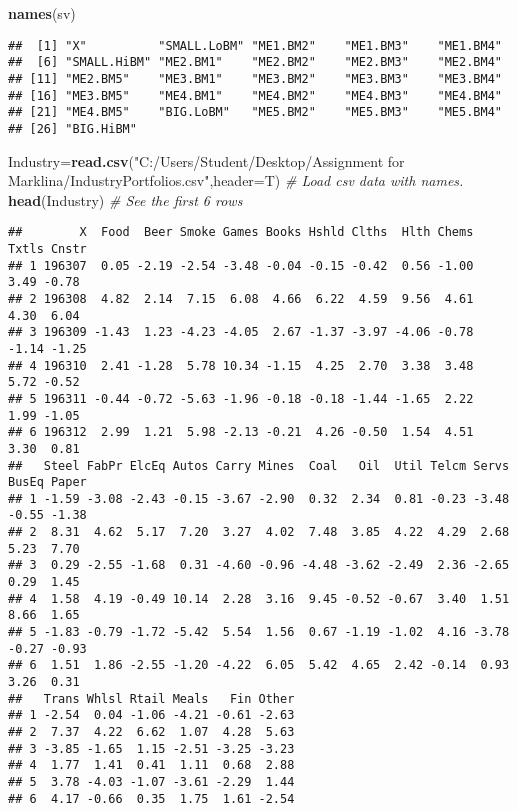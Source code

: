 \documentclass[
]{article}
\newenvironment{Shaded}{\begin{snugshade}}{\end{snugshade}}
\newcommand{\AttributeTok}[1]{\textcolor[rgb]{0.13,0.29,0.53}{#1}}
\newcommand{\CommentTok}[1]{\textcolor[rgb]{0.56,0.35,0.01}{\textit{#1}}}
\newcommand{\FunctionTok}[1]{\textcolor[rgb]{0.13,0.29,0.53}{\textbf{#1}}}
\newcommand{\NormalTok}[1]{#1}
\newcommand{\OtherTok}[1]{\textcolor[rgb]{0.56,0.35,0.01}{#1}}
\newcommand{\StringTok}[1]{\textcolor[rgb]{0.31,0.60,0.02}{#1}}
\begin{document}
\begin{Shaded}
\begin{Highlighting}[]
\FunctionTok{names}\NormalTok{(sv)}
\end{Highlighting}
\end{Shaded}

\begin{verbatim}
##  [1] "X"          "SMALL.LoBM" "ME1.BM2"    "ME1.BM3"    "ME1.BM4"   
##  [6] "SMALL.HiBM" "ME2.BM1"    "ME2.BM2"    "ME2.BM3"    "ME2.BM4"   
## [11] "ME2.BM5"    "ME3.BM1"    "ME3.BM2"    "ME3.BM3"    "ME3.BM4"   
## [16] "ME3.BM5"    "ME4.BM1"    "ME4.BM2"    "ME4.BM3"    "ME4.BM4"   
## [21] "ME4.BM5"    "BIG.LoBM"   "ME5.BM2"    "ME5.BM3"    "ME5.BM4"   
## [26] "BIG.HiBM"
\end{verbatim}

\begin{Shaded}
\begin{Highlighting}[]
\NormalTok{Industry}\OtherTok{=}\FunctionTok{read.csv}\NormalTok{(}\StringTok{"C:/Users/Student/Desktop/Assignment for Marklina/IndustryPortfolios.csv"}\NormalTok{,}\AttributeTok{header=}\NormalTok{T) }\CommentTok{\# Load csv data with names.}
\FunctionTok{head}\NormalTok{(Industry) }\CommentTok{\# See the first 6 rows}
\end{Highlighting}
\end{Shaded}

\begin{verbatim}
##        X  Food  Beer Smoke Games Books Hshld Clths  Hlth Chems Txtls Cnstr
## 1 196307  0.05 -2.19 -2.54 -3.48 -0.04 -0.15 -0.42  0.56 -1.00  3.49 -0.78
## 2 196308  4.82  2.14  7.15  6.08  4.66  6.22  4.59  9.56  4.61  4.30  6.04
## 3 196309 -1.43  1.23 -4.23 -4.05  2.67 -1.37 -3.97 -4.06 -0.78 -1.14 -1.25
## 4 196310  2.41 -1.28  5.78 10.34 -1.15  4.25  2.70  3.38  3.48  5.72 -0.52
## 5 196311 -0.44 -0.72 -5.63 -1.96 -0.18 -0.18 -1.44 -1.65  2.22  1.99 -1.05
## 6 196312  2.99  1.21  5.98 -2.13 -0.21  4.26 -0.50  1.54  4.51  3.30  0.81
##   Steel FabPr ElcEq Autos Carry Mines  Coal   Oil  Util Telcm Servs BusEq Paper
## 1 -1.59 -3.08 -2.43 -0.15 -3.67 -2.90  0.32  2.34  0.81 -0.23 -3.48 -0.55 -1.38
## 2  8.31  4.62  5.17  7.20  3.27  4.02  7.48  3.85  4.22  4.29  2.68  5.23  7.70
## 3  0.29 -2.55 -1.68  0.31 -4.60 -0.96 -4.48 -3.62 -2.49  2.36 -2.65  0.29  1.45
## 4  1.58  4.19 -0.49 10.14  2.28  3.16  9.45 -0.52 -0.67  3.40  1.51  8.66  1.65
## 5 -1.83 -0.79 -1.72 -5.42  5.54  1.56  0.67 -1.19 -1.02  4.16 -3.78 -0.27 -0.93
## 6  1.51  1.86 -2.55 -1.20 -4.22  6.05  5.42  4.65  2.42 -0.14  0.93  3.26  0.31
##   Trans Whlsl Rtail Meals   Fin Other
## 1 -2.54  0.04 -1.06 -4.21 -0.61 -2.63
## 2  7.37  4.22  6.62  1.07  4.28  5.63
## 3 -3.85 -1.65  1.15 -2.51 -3.25 -3.23
## 4  1.77  1.41  0.41  1.11  0.68  2.88
## 5  3.78 -4.03 -1.07 -3.61 -2.29  1.44
## 6  4.17 -0.66  0.35  1.75  1.61 -2.54
\end{verbatim}
\end{document}

